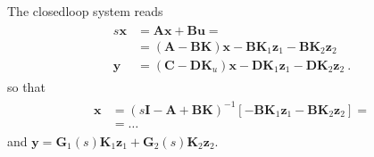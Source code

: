 \documentclass[letterpaper,10pt,english]{jupyterBook}
\begin{document}
\sphinxAtStartPar
{} The closed\sphinxhyphen{}loop system reads
\begin{equation*}
\begin{split}\begin{aligned}
  s \mathbf{x} & = \mathbf{A} \mathbf{x} + \mathbf{B} \mathbf{u} = \\
               & = \left( \mathbf{A} - \mathbf{B} \mathbf{K} \right) \mathbf{x} - \mathbf{B} \mathbf{K}_1 \mathbf{z}_1 - \mathbf{B} \mathbf{K}_2 \mathbf{z}_2 \\
  \mathbf{y} & = \left( \mathbf{C} - \mathbf{D} \mathbf{K}_u \right) \mathbf{x} - \mathbf{D} \mathbf{K}_1 \mathbf{z}_1 - \mathbf{D} \mathbf{K}_2 \mathbf{z}_2 \ .
\end{aligned}\end{split}
\end{equation*}
\sphinxAtStartPar
so that
\begin{equation*}
\begin{split}\begin{aligned}
  \mathbf{x} 
  & = \left( s \mathbf{I} - \mathbf{A} + \mathbf{B} \mathbf{K} \right)^{-1} \left[ - \mathbf{B} \mathbf{K}_1 \mathbf{z}_1 - \mathbf{B} \mathbf{K}_2 \mathbf{z}_2 \right] = \\ 
  & = \dots 
\end{aligned}\end{split}
\end{equation*}
\sphinxAtStartPar
and \(\mathbf{y} = \mathbf{G}_1(s) \mathbf{K}_1 \mathbf{z}_1 + \mathbf{G}_2(s) \mathbf{K}_2 \mathbf{z}_2\).
\end{document}

